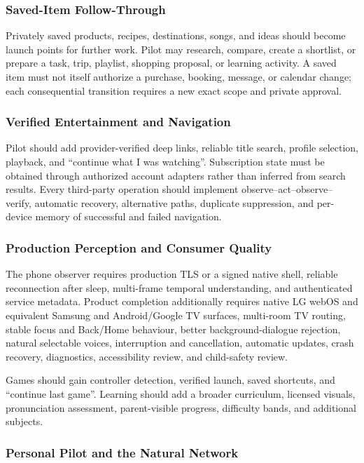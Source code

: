 \subsubsection{Saved-Item Follow-Through}

Privately saved products, recipes, destinations, songs, and ideas should become
launch points for further work.  Pilot may research, compare, create a shortlist,
or prepare a task, trip, playlist, shopping proposal, or learning activity.  A
saved item must not itself authorize a purchase, booking, message, or calendar
change; each consequential transition requires a new exact scope and private
approval.

\subsubsection{Verified Entertainment and Navigation}

Pilot should add provider-verified deep links, reliable title search, profile
selection, playback, and ``continue what I was watching''.  Subscription state
must be obtained through authorized account adapters rather than inferred from
search results.  Every third-party operation should implement
observe--act--observe--verify, automatic recovery, alternative paths, duplicate
suppression, and per-device memory of successful and failed navigation.

\subsubsection{Production Perception and Consumer Quality}

The phone observer requires production TLS or a signed native shell, reliable
reconnection after sleep, multi-frame temporal understanding, and authenticated
service metadata.  Product completion additionally requires native LG webOS and
equivalent Samsung and Android/Google TV surfaces, multi-room TV routing, stable
focus and Back/Home behaviour, better background-dialogue rejection, natural
selectable voices, interruption and cancellation, automatic updates, crash
recovery, diagnostics, accessibility review, and child-safety review.

Games should gain controller detection, verified launch, saved shortcuts, and
``continue last game''.  Learning should add a broader curriculum, licensed
visuals, pronunciation assessment, parent-visible progress, difficulty bands,
and additional subjects.

\subsubsection{Personal Pilot and the Natural Network}

